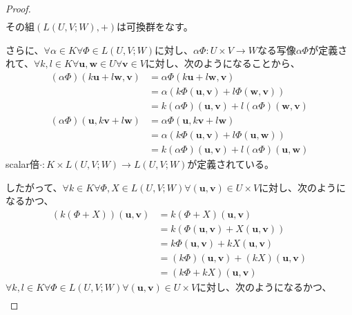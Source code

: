\documentclass[dvipdfmx]{jsarticle}
\begin{document}
\begin{proof}
\begin{align*}
\end{align*}
その組$\left( L(U,V;W), + \right)$は可換群をなす。\par
さらに、$\forall\alpha \in K\forall\varPhi \in L(U,V;W)$に対し、$\alpha\varPhi:U \times V \rightarrow W$なる写像$\alpha\varPhi$が定義されて、$\forall k,l \in K\forall\mathbf{u},\mathbf{w} \in U\forall\mathbf{v} \in V$に対し、次のようになることから、
\begin{align*}
(\alpha\varPhi)\left( k\mathbf{u} + l\mathbf{w},\mathbf{v} \right) &= \alpha\varPhi\left( k\mathbf{u} + l\mathbf{w},\mathbf{v} \right)\\
&= \alpha\left( k\varPhi\left( \mathbf{u},\mathbf{v} \right) + l\varPhi\left( \mathbf{w},\mathbf{v} \right) \right)\\
&= k(\alpha\varPhi)\left( \mathbf{u},\mathbf{v} \right) + l(\alpha\varPhi)\left( \mathbf{w},\mathbf{v} \right)\\
(\alpha\varPhi)\left( \mathbf{u},k\mathbf{v} + l\mathbf{w} \right) &= \alpha\varPhi\left( \mathbf{u},k\mathbf{v} + l\mathbf{w} \right)\\
&= \alpha\left( k\varPhi\left( \mathbf{u},\mathbf{v} \right) + l\varPhi\left( \mathbf{u},\mathbf{w} \right) \right)\\
&= k(\alpha\varPhi)\left( \mathbf{u},\mathbf{v} \right) + l(\alpha\varPhi)\left( \mathbf{u},\mathbf{w} \right)
\end{align*}
scalar倍$\cdot :K \times L(U,V;W) \rightarrow L(U,V;W)$が定義されている。\par
したがって、$\forall k \in K\forall\varPhi,X \in L(U,V;W)\forall\left( \mathbf{u},\mathbf{v} \right) \in U \times V$に対し、次のようになるかつ、
\begin{align*}
\left( k(\varPhi + X) \right)\left( \mathbf{u},\mathbf{v} \right)&=k(\varPhi + X)\left( \mathbf{u},\mathbf{v} \right)\\
&= k\left( \varPhi\left( \mathbf{u},\mathbf{v} \right) + X\left( \mathbf{u},\mathbf{v} \right) \right)\\
&= k\varPhi\left( \mathbf{u},\mathbf{v} \right) + kX\left( \mathbf{u},\mathbf{v} \right)\\
&= (k\varPhi)\left( \mathbf{u},\mathbf{v} \right) + (kX)\left( \mathbf{u},\mathbf{v} \right)\\
&= (k\varPhi + kX)\left( \mathbf{u},\mathbf{v} \right)
\end{align*}
$\forall k,l \in K\forall\varPhi \in L(U,V;W)\forall\left( \mathbf{u},\mathbf{v} \right) \in U \times V$に対し、次のようになるかつ、
\begin{align*}

\end{align*}
\end{proof}
\end{document}

